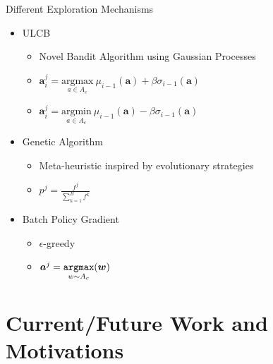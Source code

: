 \documentclass{beamer}
\begin{document}
\begin{frame}{Different Exploration Mechanisms}
\begin{itemize}
\item ULCB
\begin{itemize}
	\item Novel Bandit Algorithm using Gaussian Processes
	\item $\bm{a}_i^j = \underset{a \in A_c}{\mbox{argmax}} \ \mu_{i-1}(\bm{a}) + \beta\sigma_{i-1}(\bm{a})$
	\item $\bm{a}_i^j = \underset{a \in A_c}{\mbox{argmin}} \ \mu_{i-1}(\bm{a}) - \beta\sigma_{i-1}(\bm{a})$
\end{itemize}
\item Genetic Algorithm
\begin{itemize}
	\item Meta-heuristic inspired by evolutionary strategies
	\item $p^j = \frac{f^j}{\sum_{k=1}^{B} f^k}$
\end{itemize}
\item Batch Policy Gradient
\begin{itemize}
	\item $\epsilon$-greedy
	\item $\bm{a}^j = \underset{w \sim A_c}{\tt{argmax}}(\bm{w}) $
\end{itemize}

\end{itemize}
  

\end{frame}




\section*{Current/Future Work and Motivations}
\end{document}
